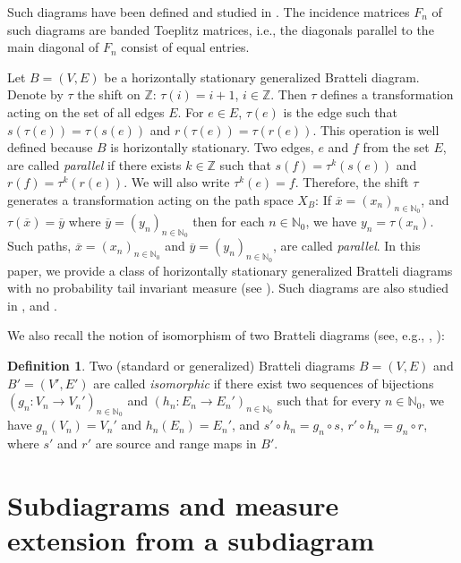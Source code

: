 \documentclass[11pt,reqno]{amsart}
\theoremstyle{definition}
\newtheorem{definition}{Definition}[section]
\theoremstyle{remark}
\theoremstyle{plain}
\def\ol{\overline}
\newcommand{\N}{\mathbb N}
\newcommand{\Z}{\mathbb Z}
\numberwithin{equation}{section}
\begin{document}
Such diagrams have been defined and studied in
\cite{BezuglyiJorgensenKarpelKwiatkowski2025}. The incidence matrices $F_n$ of such diagrams are banded Toeplitz matrices, i.e., the diagonals parallel to the main diagonal of $F_n$ consist of equal entries. 

Let $B = (V, E)$ be a horizontally stationary generalized Bratteli diagram. 
Denote by $\tau$ the shift on $\Z$: $\tau (i) = i+1$, $i\in \Z$. Then $\tau$ defines a transformation acting on the set of all edges $E$. For 
$e \in E$, 
$\tau(e)$ is the edge such that $s(\tau (e)) = \tau (s(e))$ and
$r(\tau (e)) = \tau (r(e))$. This operation is well defined because $B$ is horizontally stationary. 
Two edges, $e$ and $f$ from the set $E$, are called \textit{parallel}
if there exists $k \in \Z$ such that $s(f) = \tau^k(s(e))$ 
and $r(f) = \tau^k(r(e))$. We will also write $\tau^k(e) =f$. 
Therefore, the shift $\tau$ generates a transformation acting on the path space $X_B$: If $\ol x = (x_n)_{n \in \N_0}$, and $\tau(\ol x) = \ol y$ where
$\ol y = (y_n)_{n \in \N_0}$ then for each $n \in \N_0$, we have $y_n = \tau(x_n)$. 
Such paths, $\ol x = (x_n)_{n \in \N_0}$ and $\ol y = (y_n)_{n \in \N_0}$, are called \textit{parallel}. In this paper, we provide a class of horizontally stationary generalized Bratteli diagrams with no probability tail invariant measure (see ). Such diagrams are also studied in ,  and .

We also recall the notion of isomorphism of two Bratteli diagrams (see, e.g., \cite[Page 326]{Durand2010}, \cite[Definition 2.8.]{BezuglyiJorgensenKarpelSanadhya2025}):

\begin{definition} \label{def_isom BD}
Two (standard or generalized) Bratteli diagrams $B = (V, E)$ and $B' = 
(V', E')$ 
are called \textit{isomorphic} if there exist two sequences of
bijections $(g_n : V_n \rightarrow V_n')_{n \in \N_0}$ and 
$(h_n : E_n \rightarrow E_n')_{n \in \N_0}$ such that 
for every $n \in \N_0$, we have $g_n(V_n) = V_n'$ and $h_n(E_n) = 
E_n'$, and $s' \circ h_n = g_n \circ s$, $r' \circ h_n = 
g_n \circ r$, where $s'$ and $r'$ are source and range maps in $B'$.

\end{definition} 

\section{Subdiagrams and measure extension from a subdiagram}
\label{sect meas ext subdgrms}
\end{document}
